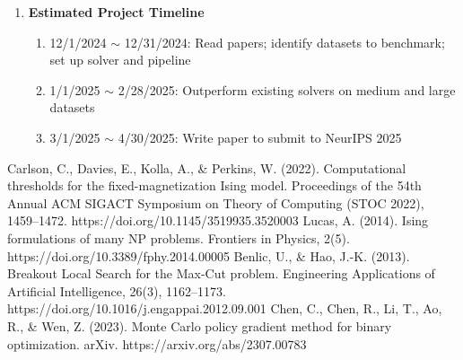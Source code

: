 \documentclass{article}
\begin{document}
\begin{enumerate}
\begin{enumerate}
\end{enumerate}

\item \textbf{Estimated Project Timeline}
\begin{enumerate}
	\item 12/1/2024 $\sim$ 12/31/2024: Read papers; identify datasets to benchmark; set up solver and pipeline
	\item 1/1/2025 $\sim$ 2/28/2025: Outperform existing solvers on medium and large datasets
	\item 3/1/2025 $\sim$ 4/30/2025: Write paper to submit to NeurIPS 2025
\end{enumerate}

\end{enumerate}

\begin{thebibliography}{00}
Carlson, C., Davies, E., Kolla, A., \& Perkins, W. (2022). Computational thresholds for the fixed-magnetization Ising model. Proceedings of the 54th Annual ACM SIGACT Symposium on Theory of Computing (STOC 2022), 1459–1472. https://doi.org/10.1145/3519935.3520003
Lucas, A. (2014). Ising formulations of many NP problems. Frontiers in Physics, 2(5). https://doi.org/10.3389/fphy.2014.00005
Benlic, U., \& Hao, J.-K. (2013). Breakout Local Search for the Max-Cut problem. Engineering Applications of Artificial Intelligence, 26(3), 1162–1173. https://doi.org/10.1016/j.engappai.2012.09.001
Chen, C., Chen, R., Li, T., Ao, R., \& Wen, Z. (2023). Monte Carlo policy gradient method for binary optimization. arXiv. https://arxiv.org/abs/2307.00783


\end{thebibliography}
\end{document}

